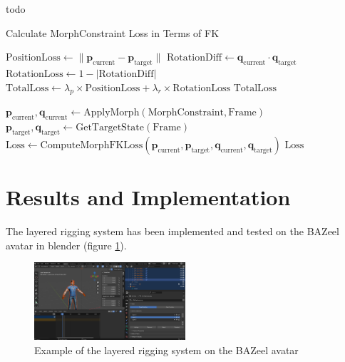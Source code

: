 \documentclass[../../main.tex]{subfiles}
\begin{document}
todo
\begin{algorithm}
    \caption{Calculate MorphConstraint Loss in Terms of FK}
    \begin{algorithmic}[1]
        \label{alg:morph_constraint_loss}
        \State $\text{PositionLoss} \gets \|\mathbf{p}_{\text{current}} - \mathbf{p}_{\text{target}}\|$
        \State $\text{RotationDiff} \gets \mathbf{q}_{\text{current}} \cdot \mathbf{q}_{\text{target}}$
        \State $\text{RotationLoss} \gets 1 - |\text{RotationDiff}|$
        \State $\text{TotalLoss} \gets \lambda_p \times \text{PositionLoss} + \lambda_r \times \text{RotationLoss}$
        \State \Return $\text{TotalLoss}$
    \EndProcedure
    
        \State $\mathbf{p}_{\text{current}}, \mathbf{q}_{\text{current}} \gets \text{ApplyMorph}(\text{MorphConstraint}, \text{Frame})$
        \State $\mathbf{p}_{\text{target}}, \mathbf{q}_{\text{target}} \gets \text{GetTargetState}(\text{Frame})$
        \State $\text{Loss} \gets \text{ComputeMorphFKLoss}(\mathbf{p}_{\text{current}}, \mathbf{p}_{\text{target}}, \mathbf{q}_{\text{current}}, \mathbf{q}_{\text{target}})$
        \State \Return $\text{Loss}$
    \EndProcedure
    
    \end{algorithmic}
\end{algorithm}

\section{Results and Implementation}
\label{ch:rigging_layers:results}

The layered rigging system has been implemented and tested on the BAZeel avatar in blender (figure \ref{fig:layers_example}).

\begin{figure}
    \centering
    \includegraphics[width=0.5\textwidth]{chapters/rigging_layers/images/layers_example.png}
    \caption{Example of the layered rigging system on the BAZeel avatar}
    \label{fig:layers_example}
\end{figure}
\end{document}
